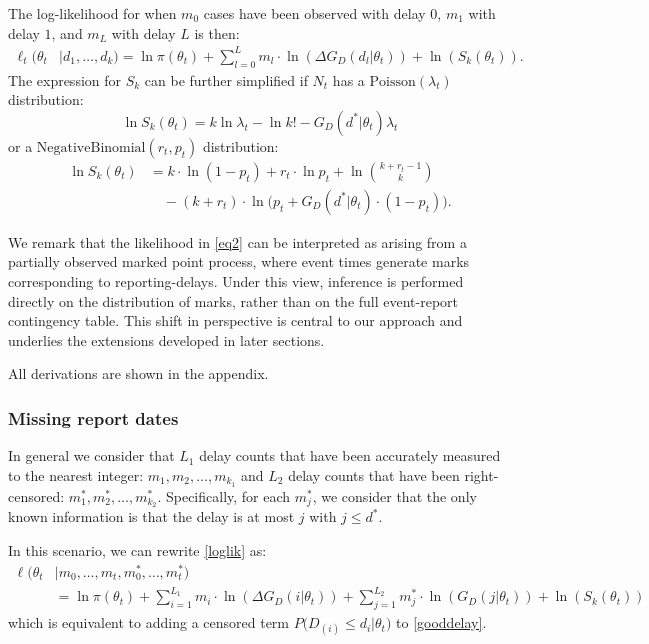 \documentclass[12pt]{article}
\begin{document}
The log-likelihood for when $m_0$ cases have been observed with delay $0$, $m_1$ with delay $1$, and $m_L$ with delay $L$ is then:
\begin{equation}\label{loglik}
\begin{aligned}
    \ell_t(\theta_t & | d_1, \dots, d_{k}) = 
    \ln{\pi(\theta_t)} + \sum\limits_{l=0}^L m_l\cdot \ln{\left(\Delta G_D(d_l|\theta_t)\right)} + \ln{\left(S_k(\theta_t)\right)}.
\end{aligned}
\end{equation}
The expression for $S_k$ can be further simplified if $N_t$ has a $\text{Poisson}(\lambda_t)$ distribution:
\begin{equation}
    \ln S_k(\theta_t) = 
k \ln \lambda_t - \ln k! - G_D(d^* | \theta_t) \lambda_t
\end{equation}
or a $\text{NegativeBinomial}(r_t,p_t)$ distribution:
\begin{equation}
\begin{aligned}
\ln S_k(\theta_t) & = 
k \cdot \ln (1 - p_t) + r_t \cdot \ln p_t + \ln \binom{k + r_t - 1}{k} 
\\ & \quad - (k + r_t)\cdot \ln \big( p_t + G_D(d^*|\theta_t) \cdot (1 - p_t) \big).
\end{aligned}
\end{equation}

We remark that the likelihood in \eqref{eq2} can be interpreted as arising from a partially observed marked point process, where event times generate marks corresponding to reporting-delays. Under this view, inference is performed directly on the distribution of marks, rather than on the full event-report contingency table. This shift in perspective is central to our approach and underlies the extensions developed in later sections.

All derivations are shown in the appendix. 


\subsubsection{Missing report dates}

In general we consider that $L_1$ delay counts that have been accurately measured to the nearest integer: $m_1, m_2, \dots, m_{k_1}$ and $L_2$ delay counts that have been right-censored: $m_1^*, m_2^*, \dots, m_{k_2}^*$. Specifically, for each $m_j^*$, we consider that the only known information is that the delay is at most $j$ with $j \leq d^*$.   

In this scenario, we can rewrite \eqref{loglik} as:
\begin{equation}\label{logliksimplified}
    \begin{aligned}
        \ell(\theta_t & | m_0, \dots, m_{t}, m_0^{*}, \dots, m_{t}^{*}) 
        \\ & = \ln{\pi(\theta_t)} + \sum\limits_{i=1}^{L_1} m_i \cdot \ln{\left(\Delta G_D(i|\theta_t)\right)} +\sum\limits_{j=1}^{L_2} m_j^{*} \cdot \ln{\left(G_D(j|\theta_t)\right)} + \ln{\left(S_k(\theta_t)\right)}
    \end{aligned}
\end{equation}
which is equivalent to adding a censored term $P\big(D_{(i)} \leq d_i|\theta_t\big)$ to \eqref{gooddelay}. 
\end{document}
